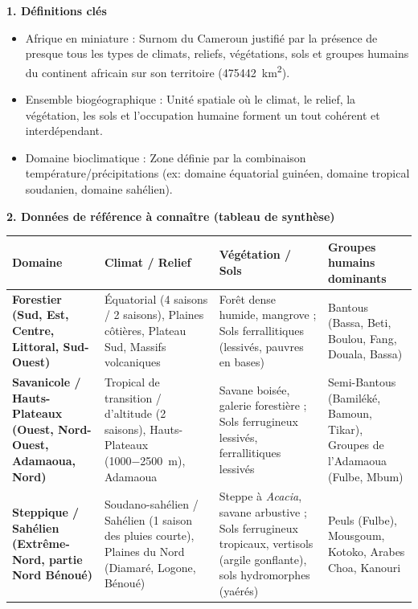 \documentclass[11pt]{article}
\newcommand{\cle}[1]{{\popxbold\color{popdark}#1}}
\begin{document}
\begin{bilan}
\textbf{1. Définitions clés}
\begin{itemize}
  \item \cle{Afrique en miniature} : Surnom du Cameroun justifié par la présence de presque tous les types de climats, reliefs, végétations, sols et groupes humains du continent africain sur son territoire (\SI{475 442}{km^2}).
  \item \cle{Ensemble biogéographique} : Unité spatiale où le climat, le relief, la végétation, les sols et l'occupation humaine forment un tout cohérent et interdépendant.
  \item \cle{Domaine bioclimatique} : Zone définie par la combinaison température/précipitations (ex: domaine équatorial guinéen, domaine tropical soudanien, domaine sahélien).
\end{itemize}

\textbf{2. Données de référence à connaître (tableau de synthèse)}
\begin{center}
\begin{tabularx}{\linewidth}{|l|X|X|X|}\hline
\rowcolor{popblueL}
\textbf{Domaine} & \textbf{Climat / Relief} & \textbf{Végétation / Sols} & \textbf{Groupes humains dominants} \\ \hline
\textbf{Forestier (Sud, Est, Centre, Littoral, Sud-Ouest)} & Équatorial (4 saisons / 2 saisons), Plaines côtières, Plateau Sud, Massifs volcaniques & Forêt dense humide, mangrove ; Sols ferrallitiques (lessivés, pauvres en bases) & Bantous (Bassa, Beti, Boulou, Fang, Douala, Bassa) \\ \hline
\textbf{Savanicole / Hauts-Plateaux (Ouest, Nord-Ouest, Adamaoua, Nord)} & Tropical de transition / d'altitude (2 saisons), Hauts-Plateaux (\SI{1000-2500}{m}), Adamaoua & Savane boisée, galerie forestière ; Sols ferrugineux lessivés, ferrallitiques lessivés & Semi-Bantous (Bamiléké, Bamoun, Tikar), Groupes de l'Adamaoua (Fulbe, Mbum) \\ \hline
\textbf{Steppique / Sahélien (Extrême-Nord, partie Nord Bénoué)} & Soudano-sahélien / Sahélien (1 saison des pluies courte), Plaines du Nord (Diamaré, Logone, Bénoué) & Steppe à \emph{Acacia}, savane arbustive ; Sols ferrugineux tropicaux, vertisols (argile gonflante), sols hydromorphes (yaérés) & Peuls (Fulbe), Mousgoum, Kotoko, Arabes Choa, Kanouri \\ \hline
\end{tabularx}
\end{center}


\end{bilan}
\end{document}
